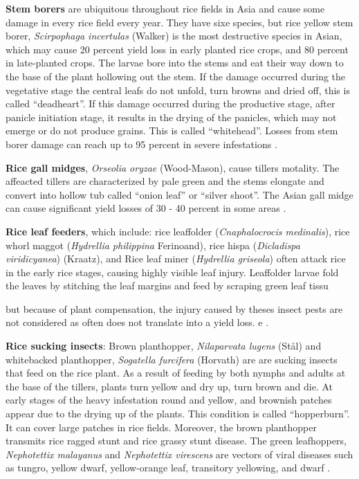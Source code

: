 \documentclass[12pt, oneside]{report}
\begin{document}
\textbf{Stem borers} are ubiquitous throughout rice fields in Asia and cause some damage in every rice field every year. They have sixe species, but rice yellow stem borer, \textit{Scirpophaga incertulas} (Walker) is the most destructive species in Asian, which may cause 20 percent yield loss in early planted rice crops, and 80 percent in late-planted crops. The larvae bore into the stems and eat their way down to the base of the plant hollowing out the stem. If the damage occurred during the vegetative stage the central leafs do not unfold, turn browns and dried off, this is called ``deadheart''. If this damage occurred during the productive stage, after panicle initiation stage, it results in the drying of the panicles, which may not emerge or do not produce grains. This is called ``whitehead''. Losses from stem borer damage can reach up to 95 percent in severe infestations \citep{irrirkb}. 

\textbf{Rice gall midges}, \textit{Orseolia oryzae} (Wood-Mason), cause tillers motality. The affeacted tillers are characterized by pale green and the stems elongate and convert into hollow tub called ``onion leaf'' or ``silver shoot''. The Asian gall midge can cause significant yield losses of 30 - 40 percent in some areas \citep{irrirkb}.

\textbf{Rice leaf feeders}, which include: rice leaffolder (\textit{Cnaphalocrocis medinalis}), rice whorl maggot (\textit{Hydrellia philippina} Ferinoand), rice hispa (\textit{Dicladispa viridicyanea}) (Kraatz), and Rice leaf miner (\textit{Hydrellia griseola}) often attack rice in the early rice stages, causing highly visible leaf injury. Leaffolder larvae fold the leaves by stitching the leaf margins and feed by scraping green leaf tissu

but because of plant compensation, the injury caused by theses insect pests are not considered as often does not translate into a yield loss. e \citep{irrirkb}. 

\textbf{Rice sucking insects}: Brown planthopper, \textit{Nilaparvata lugens} (St\aa l) and whitebacked planthopper, \textit{Sogatella furcifera} (Horvath) are are sucking insects that feed on the rice plant.  As a result of feeding by both nymphs and adults at the base of the tillers, plants turn yellow and dry up, turn brown and die. At early stages of the heavy infestation round and yellow, and brownish patches appear due to the drying up of the plants. This condition is called ``hopperburn''. It can cover large patches in rice fields. Moreover, the brown planthopper transmits rice ragged stunt and rice grassy stunt disease. The green leafhoppers, \textit{Nephotettix malayanus} and \textit{Nephotettix virescens} are vectors of viral diseases such as tungro, yellow dwarf, yellow-orange leaf, transitory yellowing, and dwarf \citep{irrirkb}.
\end{document}
